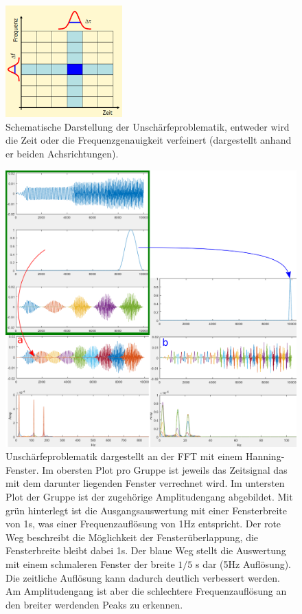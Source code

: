 \begin{figure}
	\centering
	\includegraphics[width=0.4\textwidth]{papers/wavelets/images/6-1_FFTAufloesung.png}
	\caption{\cite{J.Mayer.2002} Schematische Darstellung der Unschärfeproblematik, entweder wird die Zeit oder die Frequenzgenauigkeit verfeinert (dargestellt anhand er beiden Achsrichtungen).}
	\label{wavelet:fig:FFTAufloesung}
\end{figure}

\begin{figure}
	\centering
	\includegraphics[width=\textwidth]{papers/wavelets/images/6-2_AufloesungZeitVsFrequenz.png}
	\caption{Unschärfeproblematik dargestellt an der FFT mit einem Hanning-Fenster. Im obersten Plot pro Gruppe ist jeweils das Zeitsignal das mit dem darunter liegenden Fenster verrechnet wird. Im untersten Plot der Gruppe ist der zugehörige Amplitudengang abgebildet. Mit grün hinterlegt ist die Ausgangsauswertung mit einer Fensterbreite von 1s, was einer Frequenzauflösung von 1Hz entspricht. Der rote Weg beschreibt die Möglichkeit der Fensterüberlappung, die Fensterbreite bleibt dabei 1s. Der blaue Weg stellt die Auswertung mit einem schmaleren Fenster der breite $1/5$ s dar (5Hz Auflösung). Die zeitliche Auflösung kann dadurch deutlich verbessert werden. Am Amplitudengang ist aber die schlechtere Frequenzauflösung an den breiter werdenden Peaks zu erkennen.}
	\label{wavelet:fig:AufloesungZeitVsFrequenz}
\end{figure}

